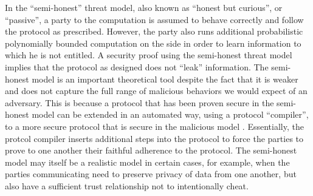 In the {}``semi-honest'' threat model, also known as {}``honest
but curious'', or {}``passive'', a party to the computation is
assumed to behave correctly and follow the protocol as prescribed.
However, the party also runs additional probabilistic polynomially
bounded computation on the side in order to learn information to which
he is not entitled. A security proof using the semi-honest threat
model implies that the protocol as designed does not {}``leak''
information. The semi-honest model is an important theoretical tool
despite the fact that it is weaker and does not capture the full range
of malicious behaviors we would expect of an adversary. This is because
a protocol that has been proven secure in the semi-honest model can
be extended in an automated way, using a protocol {}``compiler'',
to a more secure protocol that is secure in the malicious model \cite{GMW87}.
Essentially, the protcol compiler inserts additional steps into the
protocol to force the parties to prove to one another their faithful
adherence to the protocol. The semi-honest model may itself be a realistic
model in certain cases, for example, when the parties communicating
need to preserve privacy of data from one another, but also have a
sufficient trust relationship not to intentionally cheat.

%
\begin{comment}



\end{comment}
{}
